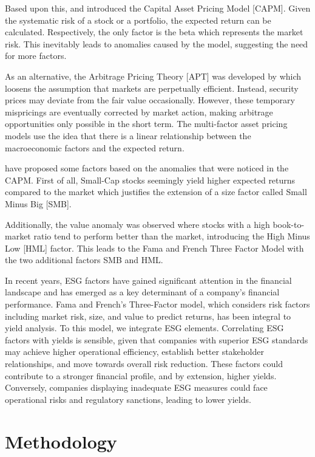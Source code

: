 \documentclass[12pt, a4paper]{article}%
\begin{document}
Based upon this, \textcite{Sharpe1964} and \textcite{Lintner1965} introduced the Capital Asset Pricing Model [CAPM]. Given the systematic risk of a stock or a portfolio, the expected return can be calculated. Respectively, the only factor is the beta which represents the market risk. This inevitably leads to anomalies caused by the model, suggesting the need for more factors.

As an alternative, the Arbitrage Pricing Theory [APT] was developed by \textcite{Ross1976} which loosens the assumption that markets are perpetually efficient. Instead, security prices may deviate from the fair value occasionally. However, these temporary mispricings are eventually corrected by market action, making arbitrage opportunities only possible in the short term.
The multi-factor asset pricing models use the idea that there is a linear relationship between the macroeconomic factors and the expected return.

\textcite{FamaFrench1992} have proposed some factors based on the anomalies that were noticed in the CAPM.
First of all, Small-Cap stocks seemingly yield higher expected returns compared to the market which justifies the extension of a size factor called Small Minus Big [SMB].

Additionally, the value anomaly was observed where stocks with a high book-to-market ratio tend to perform better than the market, introducing the High Minus Low [HML] factor.
This leads to the Fama and French Three Factor Model with the two additional factors SMB and HML.

In recent years, ESG factors have gained significant attention in the financial landscape and has emerged as a key determinant of a company’s financial performance. Fama and French's Three-Factor model, which considers risk factors including market risk, size, and value to predict returns, has been integral to yield analysis. To this model, we integrate ESG elements.
Correlating ESG factors with yields is sensible, given that companies with superior ESG standards may achieve higher operational efficiency, establish better stakeholder relationships, and move towards overall risk reduction. These factors could contribute to a stronger financial profile, and by extension, higher yields. Conversely, companies displaying inadequate ESG measures could face operational risks and regulatory sanctions, leading to lower yields.

\section{Methodology} %
\end{document}
